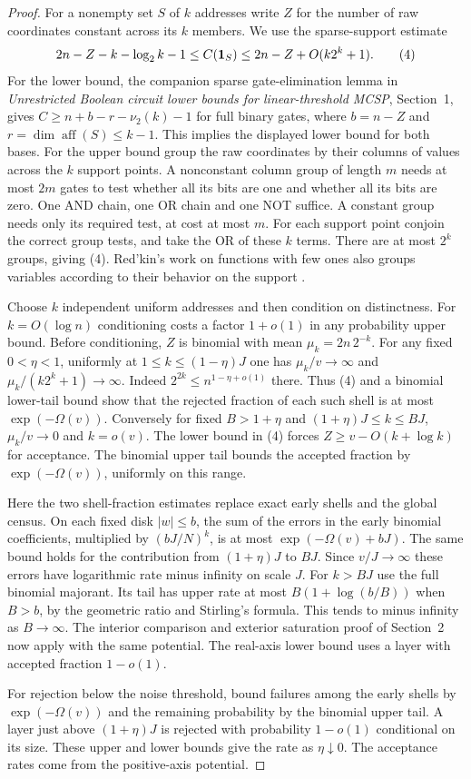 \begin{proof}
For a nonempty set $S$ of $k$ addresses write $Z$ for the number of raw coordinates constant across its $k$ members. We use the sparse-support estimate
\[
       2n-Z-k-\log_2 k-1 \le C({\bf1}_S)
                    \le 2n-Z+O(k2^k+1).                         \tag{4}
\]
For the lower bound, the companion sparse gate-elimination lemma in \emph{Unrestricted Boolean circuit lower bounds for linear-threshold MCSP}, Section~1, gives $C\ge n+b-r-\nu_2(k)-1$ for full binary gates, where $b=n-Z$ and $r=\dim\operatorname{aff}(S)\le k-1$. This implies the displayed lower bound for both bases. For the upper bound group the raw coordinates by their columns of values across the $k$ support points. A nonconstant column group of length $m$ needs at most $2m$ gates to test whether all its bits are one and whether all its bits are zero. One AND chain, one OR chain and one NOT suffice. A constant group needs only its required test, at cost at most $m$. For each support point conjoin the correct group tests, and take the OR of these $k$ terms. There are at most $2^k$ groups, giving (4). Red'kin's work on functions with few ones also groups variables according to their behavior on the support \cite{red}.

Choose $k$ independent uniform addresses and then condition on distinctness. For $k=O(\log n)$ conditioning costs a factor $1+o(1)$ in any probability upper bound. Before conditioning, $Z$ is binomial with mean $\mu_k=2n\,2^{-k}$. For any fixed $0<\eta<1$, uniformly at $1\le k\le(1-\eta)J$ one has $\mu_k/v\to\infty$ and $\mu_k/(k2^k+1)\to\infty$. Indeed $2^{2k}\le n^{1-\eta+o(1)}$ there. Thus (4) and a binomial lower-tail bound show that the rejected fraction of each such shell is at most $\exp(-\Omega(v))$. Conversely for fixed $B>1+\eta$ and $(1+\eta)J\le k\le BJ$, $\mu_k/v\to0$ and $k=o(v)$. The lower bound in (4) forces $Z\ge v-O(k+\log k)$ for acceptance. The binomial upper tail bounds the accepted fraction by $\exp(-\Omega(v))$, uniformly on this range.

Here the two shell-fraction estimates replace exact early shells and the global census. On each fixed disk $|w|\le b$, the sum of the errors in the early binomial coefficients, multiplied by $(bJ/N)^k$, is at most $\exp(-\Omega(v)+bJ)$. The same bound holds for the contribution from $(1+\eta)J$ to $BJ$. Since $v/J\to\infty$ these errors have logarithmic rate minus infinity on scale $J$. For $k>BJ$ use the full binomial majorant. Its tail has upper rate at most $B(1+\log(b/B))$ when $B>b$, by the geometric ratio and Stirling's formula. This tends to minus infinity as $B\to\infty$. The interior comparison and exterior saturation proof of Section~2 now apply with the same potential. The real-axis lower bound uses a layer with accepted fraction $1-o(1)$.

For rejection below the noise threshold, bound failures among the early shells by $\exp(-\Omega(v))$ and the remaining probability by the binomial upper tail. A layer just above $(1+\eta)J$ is rejected with probability $1-o(1)$ conditional on its size. These upper and lower bounds give the rate as $\eta\downarrow0$. The acceptance rates come from the positive-axis potential.
\end{proof}

